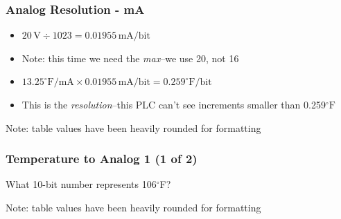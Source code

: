 \begin{frame}
    \frametitle{Analog Resolution - mA}

    \begin{itemize}
        \item $20\,\text{V} \div 1023 = 0.01955\,\text{mA/bit}$
        \item Note: this time we need the \emph{max}--we use 20, not 16
        \item $13.25^\circ\text{F/mA} \times 0.01955\,\text{mA/bit} = 0.259^\circ\text{F/bit}$
        \item This is the \emph{resolution}--this PLC can't see increments smaller than 0.259$^\circ\text{F}$
    \end{itemize}

    \vspace{1em}

    \begin{table}
        \centering
        {\scriptsize Note: table values have been heavily rounded for formatting\par}
    \end{table}    
\end{frame}

\begin{frame}
    \frametitle{Temperature to Analog 1 (1 of 2)}

    \centering
    \Large{What 10-bit number represents 106$^\circ$F?}

    \vspace{1em}

    \begin{table}
        \centering
        {\scriptsize Note: table values have been heavily rounded for formatting\par}
    \end{table}  
\end{frame}

